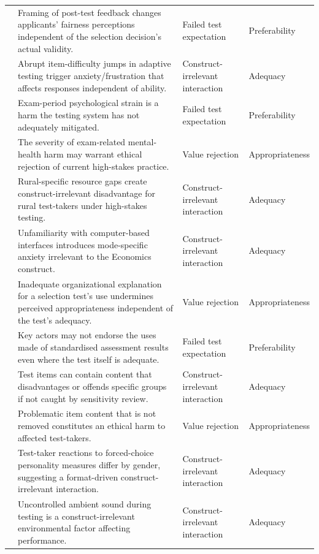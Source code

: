 \documentclass[11pt]{article}
\begin{document}
{\begin{longtable}{p{2.6cm} p{8.6cm} p{2.6cm} p{1.7cm}}
\citet{feeney2022rejection} & Framing of post-test feedback changes applicants' fairness perceptions independent of the selection decision's actual validity. & Failed test expectation & Preferability \\
\citet{watson2026cat} & Abrupt item-difficulty jumps in adaptive testing trigger anxiety/frustration that affects responses independent of ability. & Construct-irrelevant interaction & Adequacy \\
\citet{george2024examstress} & Exam-period psychological strain is a harm the testing system has not adequately mitigated. & Failed test expectation & Preferability \\
\citet{george2024examstress} & The severity of exam-related mental-health harm may warrant ethical rejection of current high-stakes practice. & Value rejection & Appropriateness \\
\citet{steuart2024ruralteachers} & Rural-specific resource gaps create construct-irrelevant disadvantage for rural test-takers under high-stakes testing. & Construct-irrelevant interaction & Adequacy \\
\citet{eleje2023cbtppt} & Unfamiliarity with computer-based interfaces introduces mode-specific anxiety irrelevant to the Economics construct. & Construct-irrelevant interaction & Adequacy \\
\citet{stierwalt2000explanations} & Inadequate organizational explanation for a selection test's use undermines perceived appropriateness independent of the test's adequacy. & Value rejection & Appropriateness \\
\citet{mccauley2021irish} & Key actors may not endorse the uses made of standardised assessment results even where the test itself is adequate. & Failed test expectation & Preferability \\
\citet{grand2013sensitivity} & Test items can contain content that disadvantages or offends specific groups if not caught by sensitivity review. & Construct-irrelevant interaction & Adequacy \\
\citet{grand2013sensitivity} & Problematic item content that is not removed constitutes an ethical harm to affected test-takers. & Value rejection & Appropriateness \\
\citet{zhou2024genderforced} & Test-taker reactions to forced-choice personality measures differ by gender, suggesting a format-driven construct-irrelevant interaction. & Construct-irrelevant interaction & Adequacy \\
\citet{amsberry2018sound} & Uncontrolled ambient sound during testing is a construct-irrelevant environmental factor affecting performance. & Construct-irrelevant interaction & Adequacy \\

\end{longtable}}
\end{document}
